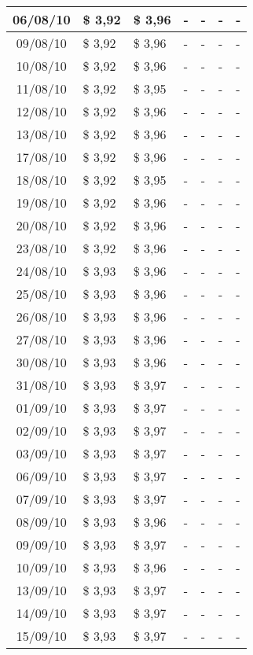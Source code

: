 \begin{center}
\begin{longtable}{|c|p{1.5cm}|p{1.5cm}|p{1.5cm}|p{1.5cm}|p{1.5cm}|p{1.5cm}|}
06/08/10 & \$ 3,92 & \$ 3,96 & - & - & - & - \\ \hline
09/08/10 & \$ 3,92 & \$ 3,96 & - & - & - & - \\ \hline
10/08/10 & \$ 3,92 & \$ 3,96 & - & - & - & - \\ \hline
11/08/10 & \$ 3,92 & \$ 3,95 & - & - & - & - \\ \hline
12/08/10 & \$ 3,92 & \$ 3,96 & - & - & - & - \\ \hline
13/08/10 & \$ 3,92 & \$ 3,96 & - & - & - & - \\ \hline
17/08/10 & \$ 3,92 & \$ 3,96 & - & - & - & - \\ \hline
18/08/10 & \$ 3,92 & \$ 3,95 & - & - & - & - \\ \hline
19/08/10 & \$ 3,92 & \$ 3,96 & - & - & - & - \\ \hline
20/08/10 & \$ 3,92 & \$ 3,96 & - & - & - & - \\ \hline
23/08/10 & \$ 3,92 & \$ 3,96 & - & - & - & - \\ \hline
24/08/10 & \$ 3,93 & \$ 3,96 & - & - & - & - \\ \hline
25/08/10 & \$ 3,93 & \$ 3,96 & - & - & - & - \\ \hline
26/08/10 & \$ 3,93 & \$ 3,96 & - & - & - & - \\ \hline
27/08/10 & \$ 3,93 & \$ 3,96 & - & - & - & - \\ \hline
30/08/10 & \$ 3,93 & \$ 3,96 & - & - & - & - \\ \hline
31/08/10 & \$ 3,93 & \$ 3,97 & - & - & - & - \\ \hline
01/09/10 & \$ 3,93 & \$ 3,97 & - & - & - & - \\ \hline
02/09/10 & \$ 3,93 & \$ 3,97 & - & - & - & - \\ \hline
03/09/10 & \$ 3,93 & \$ 3,97 & - & - & - & - \\ \hline
06/09/10 & \$ 3,93 & \$ 3,97 & - & - & - & - \\ \hline
07/09/10 & \$ 3,93 & \$ 3,97 & - & - & - & - \\ \hline
08/09/10 & \$ 3,93 & \$ 3,96 & - & - & - & - \\ \hline
09/09/10 & \$ 3,93 & \$ 3,97 & - & - & - & - \\ \hline
10/09/10 & \$ 3,93 & \$ 3,96 & - & - & - & - \\ \hline
13/09/10 & \$ 3,93 & \$ 3,97 & - & - & - & - \\ \hline
14/09/10 & \$ 3,93 & \$ 3,97 & - & - & - & - \\ \hline
15/09/10 & \$ 3,93 & \$ 3,97 & - & - & - & - \\ \hline

\end{longtable}
\end{center}
